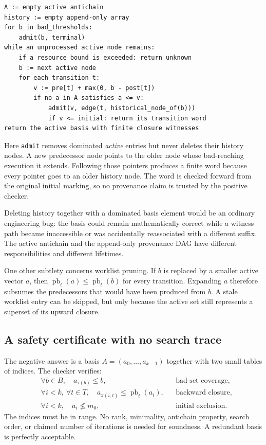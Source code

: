 \documentclass[11pt,a4paper]{article}
\theoremstyle{definition}\newtheorem{definition}[theorem]{Definition}
\theoremstyle{remark}\newtheorem{remark}[theorem]{Remark}
\newcommand{\code}[1]{\nolinkurl{#1}}
\begin{document}
\begin{lstlisting}
A := empty active antichain
history := empty append-only array
for b in bad_thresholds:
    admit(b, terminal)
while an unprocessed active node remains:
    if a resource bound is exceeded: return unknown
    b := next active node
    for each transition t:
        v := pre[t] + max(0, b - post[t])
        if no a in A satisfies a <= v:
            admit(v, edge(t, historical_node_of(b)))
            if v <= initial: return its transition word
return the active basis with finite closure witnesses
\end{lstlisting}

Here \code{admit} removes dominated \emph{active} entries but never deletes their history nodes. A new predecessor node points to the older node whose bad-reaching execution it extends. Following those pointers produces a finite word because every pointer goes to an older history node. The word is checked forward from the original initial marking, so no provenance claim is trusted by the positive checker.

Deleting history together with a dominated basis element would be an ordinary engineering bug: the basis could remain mathematically correct while a witness path became inaccessible or was accidentally reassociated with a different suffix. The active antichain and the append-only provenance DAG have different responsibilities and different lifetimes.

One other subtlety concerns worklist pruning. If $b$ is replaced by a smaller active vector $a$, then $\operatorname{pb}_t(a)\le\operatorname{pb}_t(b)$ for every transition. Expanding $a$ therefore subsumes the predecessors that would have been produced from $b$. A stale worklist entry can be skipped, but only because the active set still represents a superset of its upward closure.

\subsection{A safety certificate with no search trace}
The negative answer is a basis $A=(a_0,\ldots,a_{k-1})$ together with two small tables of indices. The checker verifies:
\begin{align}
 &\forall b\in B,\quad a_{\tau(b)}\le b,
 &&\text{bad-set coverage}, \label{eq:badcover}\\
 &\forall i<k,\ \forall t\in T,\quad
 a_{\pi(i,t)}\le\operatorname{pb}_t(a_i),
 &&\text{backward closure}, \label{eq:backclose}\\
 &\forall i<k,\quad a_i\nleq m_0,
 &&\text{initial exclusion}. \label{eq:exclude}
\end{align}
The indices must be in range. No rank, minimality, antichain property, search order, or claimed number of iterations is needed for soundness. A redundant basis is perfectly acceptable.
\end{document}
